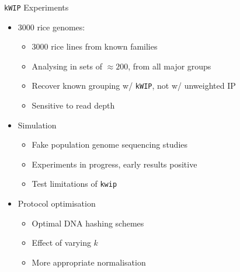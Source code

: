 \documentclass[t]{beamer}
\begin{document}
\begin{frame}{\texttt{kWIP} Experiments}
  \begin{itemize}
    \item 3000 rice genomes:
      \begin{itemize}
        \item 3000 rice lines from known families
        \item Analysing in sets of $\approx 200$, from all major groups
        \item Recover known grouping w/ \texttt{kWIP}, not w/ unweighted IP
        \item Sensitive to read depth
      \end{itemize}
      \pause
    \item Simulation
      \begin{itemize}
        \item Fake population genome sequencing studies
        \item Experiments in progress, early results positive
        \item Test limitations of \texttt{kwip}
      \end{itemize}
      \pause
    \item Protocol optimisation
      \begin{itemize}
        \item Optimal DNA hashing schemes
        \item Effect of varying $k$
        \item More appropriate normalisation
      \end{itemize}
  \end{itemize}
\end{frame}
\end{document}
